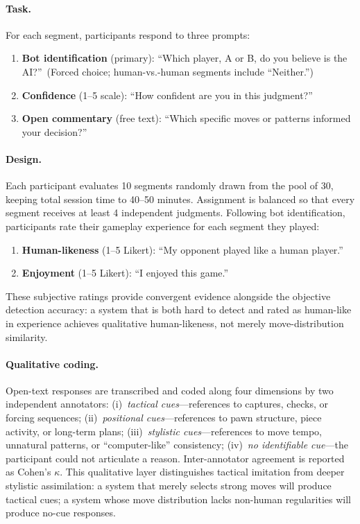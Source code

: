 \paragraph{Task.}
For each segment, participants respond to three prompts:
\begin{enumerate}[leftmargin=*, itemsep=2pt]
  \item \textbf{Bot identification} (primary): ``Which player, A or B, do you believe is the AI?''\ (Forced choice; human-vs.-human segments include ``Neither.'')
  \item \textbf{Confidence} (1--5 scale): ``How confident are you in this judgment?''
  \item \textbf{Open commentary} (free text): ``Which specific moves or patterns informed your decision?''
\end{enumerate}

\paragraph{Design.}
Each participant evaluates 10 segments randomly drawn from the pool of 30, keeping total session time to 40--50 minutes. Assignment is balanced so that every segment receives at least 4 independent judgments. Following bot identification, participants rate their gameplay experience for each segment they played:
\begin{enumerate}[leftmargin=*, itemsep=2pt]
  \item \textbf{Human-likeness} (1--5 Likert): ``My opponent played like a human player.''
  \item \textbf{Enjoyment} (1--5 Likert): ``I enjoyed this game.''
\end{enumerate}
These subjective ratings provide convergent evidence alongside the objective detection accuracy: a system that is both hard to detect and rated as human-like in experience achieves qualitative human-likeness, not merely move-distribution similarity.

\paragraph{Qualitative coding.}
Open-text responses are transcribed and coded along four dimensions by two independent annotators: (i)~\emph{tactical cues}---references to captures, checks, or forcing sequences; (ii)~\emph{positional cues}---references to pawn structure, piece activity, or long-term plans; (iii)~\emph{stylistic cues}---references to move tempo, unnatural patterns, or ``computer-like'' consistency; (iv)~\emph{no identifiable cue}---the participant could not articulate a reason. Inter-annotator agreement is reported as Cohen's $\kappa$. This qualitative layer distinguishes tactical imitation from deeper stylistic assimilation: a system that merely selects strong moves will produce tactical cues; a system whose move distribution lacks non-human regularities will produce no-cue responses.

